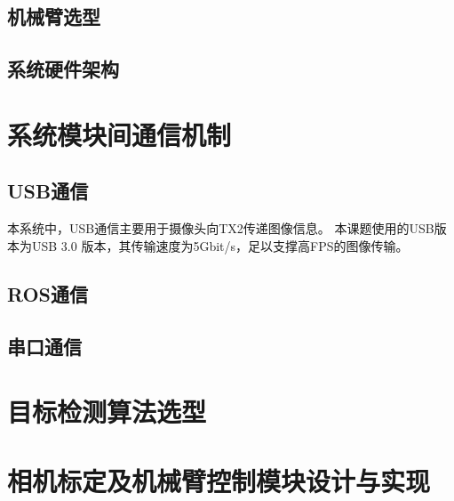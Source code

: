\subsection{机械臂选型}

\subsection{系统硬件架构}

\section{系统模块间通信机制}

\subsection{USB通信}

本系统中，USB通信主要用于摄像头向TX2传递图像信息。
本课题使用的USB版本为USB 3.0    \cite{USB3.0}版本，其传输速度为5Gbit/s，足以支撑高FPS的图像传输。

\subsection{ROS通信}

\subsection{串口通信}

\section{目标检测算法选型}

\section{相机标定及机械臂控制模块设计与实现}



